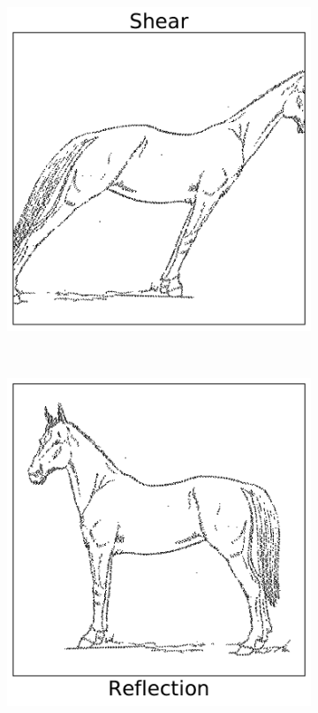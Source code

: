 \begin{figure}[H]
\begin{subfigure}{.32\textwidth}
\end{subfigure}
%
\begin{subfigure}{.32\textwidth}
    \centering
    \includegraphics[width=\linewidth]{figures/ShearHorse.pdf}
\end{subfigure}
\\
\begin{subfigure}{.32\textwidth}
    \centering
    \includegraphics[width=\linewidth]{figures/ReflectionHorse.pdf}

\end{subfigure}
\end{figure}
